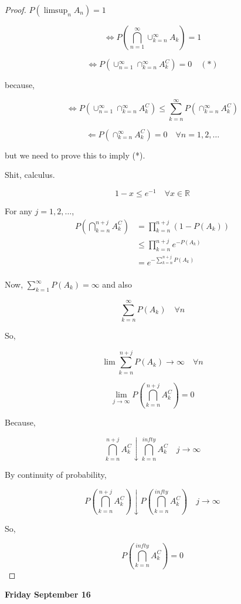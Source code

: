 \documentclass[11pt,fleqn]{book} %
\begin{document}
\begin{proof}
	$P(\limsup_n A_n) = 1$

	$$\Leftrightarrow P(\bigcap^\infty_{n=1} \cup^\infty_{k=n} A_k) = 1 $$

	$$\Leftrightarrow P(\cup^\infty_{n=1} \cap^\infty_{k=n} A^C_k) = 0 \quad (*)$$

	because, 

	$$\Leftrightarrow P(\cup^\infty_{n=1} \cap^\infty_{k=n} A^C_k) \leq \displaystyle \sum^\infty_{k=n} P(\cap^\infty_{k=n} A_k^C )  $$

	$$\Leftarrow P(\cap^\infty_{k=n} A_k^C ) = 0 \quad \forall n = 1, 2, \dots $$

	but we need to prove this to imply (*). 

	Shit, calculus. 

	$$1 - x \leq e^{-1} \quad \forall x \in \mathbb{R} $$


	For any $j = 1, 2, \dots$, 
	\begin{align*}
		P\left( \bigcap^{n+j}_{k=n} A_k^C \right) &= \prod^{n+j}_{k=n} (1 - P(A_k))\\
			&\leq \prod^{n+j}_{k=n} e^{-P(A_k)}\\
			&= e^{- \sum^{n+j}_{k=n} P(A_k)}\\
	\end{align*}

	Now,  $\sum^{\infty}_{k=1} P(A_k) = \infty$ and also

	$$ \sum^{\infty}_{k=n} P(A_k) \quad \forall n $$

	So, 

	$$\lim \sum^{n+j}_{k=n} P(A_k) \rightarrow \infty \quad \forall n$$

	$$\lim_{j \rightarrow \infty} P\left(\bigcap^{n+j}_{k=n} A_k^C \right) = 0 $$

	Because, 

	$$\bigcap^{n+j}_{k=n} A_k^C \downarrow \bigcap^{infty}_{k=n} A_k^C \quad j \rightarrow \infty $$

	By continuity of probability, 

	$$ P\left(\bigcap^{n+j}_{k=n} A_k^C \right) \downarrow P\left(\bigcap^{infty}_{k=n} A_k^C \right)\quad j \rightarrow \infty$$

	So, 

	$$P\left(\bigcap^{infty}_{k=n} A_k^C \right) = 0 $$

\end{proof}

\textbf{Friday September 16}\\
\end{document}
